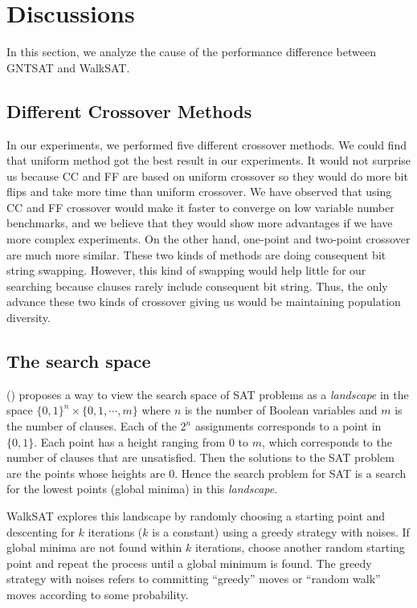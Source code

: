 \section{Discussions}
In this section, we analyze the cause of the performance difference between
GNTSAT and WalkSAT.

\subsection{Different Crossover Methods}
In our experiments, we performed five different crossover methods. We could
find that uniform method got the best result in our experiments. It would not
surprise us because CC and FF are based on uniform crossover so they would do
more bit flips and take more time than uniform crossover. We have observed
that using CC and FF crossover would make it faster to converge on low
variable number benchmarks, and we believe that they would show more
advantages if we have more complex experiments. On the other hand, one-point
and two-point crossover are much more similar. These two kinds of methods are
doing consequent bit string swapping. However, this kind of swapping would
help little for our searching because clauses rarely include consequent bit
string. Thus, the only advance these two kinds of crossover giving us would be
maintaining population diversity.

\subsection{The search space}
\citeauthor{biere2009handbook} (\citeyear{biere2009handbook}) proposes a way to view the search space of
SAT problems as a \textit{landscape} in the space $\{0, 1\}^n \times \{0,1,\cdots,m\}$
where $n$ is the number of Boolean variables and
$m$ is the number of clauses. Each of the
$2^n$ assignments corresponds to a point in
$\{0,1\}$. Each point has a height ranging from
$0$ to $m$, which corresponds to the
number of clauses that are unsatisfied. Then the solutions to the SAT problem
are the points whose heights are $0$. Hence the search
problem for SAT is a search for the lowest points (global minima) in this
\textit{landscape}.

WalkSAT explores this landscape by randomly choosing a starting point and
descenting for $k$ iterations ($k$ is a
constant) using a greedy strategy with noises. If global minima are not found
within $k$ iterations, choose another random starting point
and repeat the process until a global minimum is found. The greedy strategy
with noises refers to committing ``greedy'' moves or ``random walk'' moves
according to some probability.

